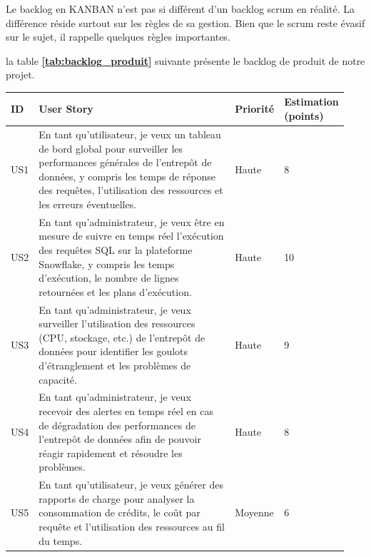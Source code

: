  \par Le backlog en KANBAN n'est pas si différent d'un backlog scrum en réalité. La différence réside surtout sur les règles de sa gestion. Bien que le scrum reste évasif sur le sujet, il rappelle quelques règles importantes\cite{BPK}.  
    
    \par la table \textbf{\ref{tab:backlog_produit}} suivante présente le backlog de produit de notre projet. 
\begin{center}

    \begin{longtable}{|p{0.05\linewidth}|p{0.65\linewidth}|p{0.12\linewidth}|p{0.12\linewidth}|}
        \hline       
        \rowcolor{blue!18}\textbf{ID} & \textbf{User Story} &  \textbf{Priorité} & \textbf{Estimation (points)} \\
        \hline
        \endfirsthead
        US1 &  En tant qu'utilisateur, je veux un tableau de bord global pour surveiller les performances générales de l'entrepôt de données, y compris les temps de réponse des requêtes, l'utilisation des ressources et les erreurs éventuelles. & Haute & 8 \\
        
        \hline
        
        US2 &  En tant qu'administrateur, je veux être en mesure de suivre en temps réel l'exécution des requêtes SQL sur la plateforme Snowflake, y compris les temps d'exécution, le nombre de lignes retournées et les plans d'exécution. & Haute & 10 \\
        
        \hline
        
        US3 &  En tant qu'administrateur, je veux surveiller l'utilisation des ressources (CPU, stockage, etc.) de l'entrepôt de données pour identifier les goulots d'étranglement et les problèmes de capacité. & Haute & 9 \\
        
        \hline
        
        US4 &  En tant qu'administrateur, je veux recevoir des alertes en temps réel en cas de dégradation des performances de l'entrepôt de données afin de pouvoir réagir rapidement et résoudre les problèmes. & Haute & 8 \\
        
        \hline
        
        US5 & En tant qu'utilisateur, je veux générer des rapports de charge pour analyser la consommation de crédits, le coût par requête et l'utilisation des ressources au fil du temps. & Moyenne & 6 \\
        

\end{longtable}
\end{center}
